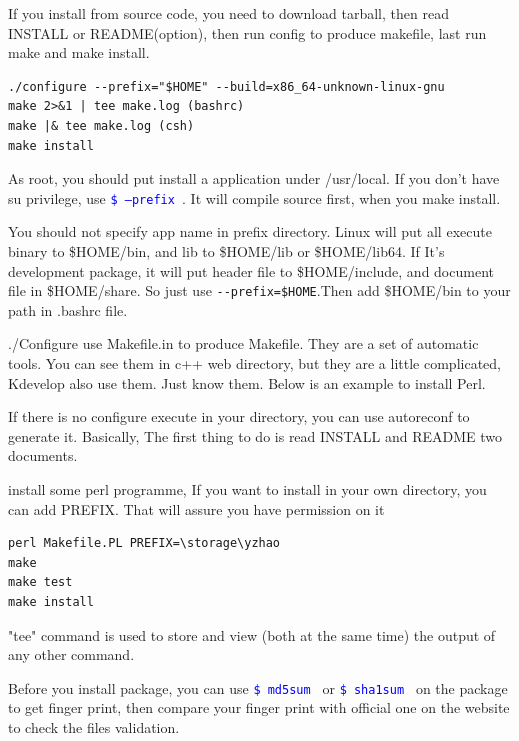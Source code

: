 \documentclass[paper=8.5in:11in, twoside, 12pt, pagesize=pdftex]{book}
\newcommand{\linuxcommand}[1]{\texttt{\textcolor{blue}{\$ #1 \Pisymbol{psy}{191}}}}
\begin{document}
	\par If you install from source code, you need to download tarball, then read INSTALL or README(option), then run config to produce makefile, last run make and make install.
\begin{verbatim}
./configure --prefix="$HOME" --build=x86_64-unknown-linux-gnu 
make 2>&1 | tee make.log (bashrc)
make |& tee make.log (csh)
make install 	
\end{verbatim}

     \par As root, you should put install a application under /usr/local. If you don't have su privilege, use \linuxcommand{--prefix}.  It will compile source first, when you make install.

	 \par You should not specify app name in prefix directory. Linux will put all execute binary to \$HOME/bin, and lib to \$HOME/lib or \$HOME/lib64. If It's development package, it will put header file to \$HOME/include, and document file in \$HOME/share. So just use \verb!--prefix=$HOME!.Then add \$HOME/bin to your path in .bashrc file.  
	
	 \par ./Configure use Makefile.in to produce Makefile. They are a set of automatic tools. You can see them in c++ web directory, but they are a little complicated, Kdevelop also use them.  Just know them.  Below is an example to install Perl.

	 \par If there is no configure execute in your directory, you can use autoreconf to generate it. Basically, The first thing to do is read INSTALL and README two documents. 

	 \par install some perl programme, If you want to install in your own directory, you can add PREFIX. That will assure you have permission on it
\begin{verbatim}
perl Makefile.PL PREFIX=\storage\yzhao
make
make test
make install
\end{verbatim}

	\par "tee" command is used to store and view (both at the same time) the output of any other command. 

	\par Before you install package, you can use \linuxcommand{md5sum} or \linuxcommand{sha1sum} on the package to get finger print, then compare your finger print with official one on the website to check the files validation.  
				
\end{document}
